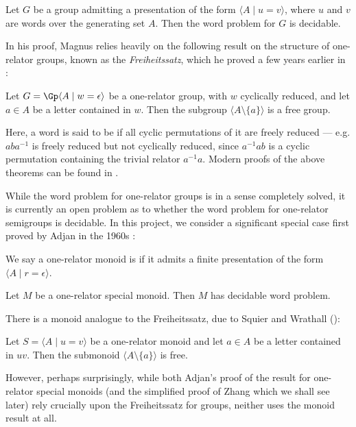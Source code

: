 \documentclass[noindex,noinsetproof,emphthm,12pt]{lmaths}
\begin{document}
\begin{theorem} \label{thm:orgp-decidablewp}
	Let $G$ be a group admitting a presentation of the form $\langle A \mid u = v\rangle$, where $u$ and $v$ are words over the generating set $A$. Then the word problem for $G$ is decidable.
\end{theorem}

In his proof, Magnus relies heavily on the following result on the structure of one-relator groups, known as the \emph{Freiheitssatz}, which he proved a few years earlier in \cite{Magnus1930}:

\begin{theorem}[Freiheitssatz] \label{thm:freiheitssatz}
	Let $G = \Gp \langle A \mid w = \epsilon \rangle$ be a one-relator group, with $w$ cyclically reduced, and let $a \in A$ be a letter contained in $w$. Then the subgroup $\langle A \setminus \{a\} \rangle$ is a free group.
\end{theorem}

Here, a word is said to be  if all cyclic permutations of it are freely reduced --- e.g. $aba^{-1}$ is freely reduced but not cyclically reduced, since $a^{-1}ab$ is a cyclic permutation containing the trivial relator $a^{-1}a$. Modern proofs of the above theorems can be found in \cite{Lyndon2001}.

While the word problem for one-relator groups is in a sense completely solved, it is currently an open problem as to whether the word problem for one-relator semigroups is decidable. In this project, we consider a significant special case first proved by Adjan in the 1960s \cite{Adian1966}:

\begin{defn}
We say a one-relator monoid is  if it admits a finite presentation of the form $\langle A \mid r = \epsilon \rangle$.
\end{defn}

\begin{theorem}[Adjan]
	Let $M$ be a one-relator special monoid. Then $M$ has decidable word problem.
\end{theorem}

There is a monoid analogue to the Freiheitssatz, due to Squier and Wrathall (\cite{Squier1983}):
\begin{theorem}
	Let $S = \langle A \mid u = v \rangle$ be a one-relator monoid and let $a \in A$ be a letter contained in $uv$. Then the submonoid $\langle A \setminus \{a\} \rangle$ is free.
\end{theorem}
However, perhaps surprisingly, while both Adjan's proof of the result for one-relator special monoids (and the simplified proof of Zhang which we shall see later) rely crucially upon the Freiheitssatz for groups, neither uses the monoid result at all.
\end{document}
